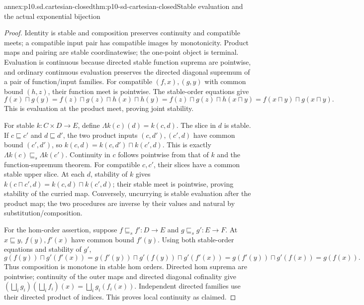 \begin{annexitem}{annex:p10.sd.cartesian-closed}{thm:p10-sd-cartesian-closed}{Stable evaluation and the actual exponential bijection}
\begin{proof}
Identity is stable and composition preserves continuity and compatible
meets; a compatible input pair has compatible images by monotonicity.
Product maps and pairing are stable coordinatewise; the one-point object
is terminal. Evaluation is continuous because directed stable function
suprema are pointwise, and ordinary continuous evaluation preserves the
directed diagonal supremum of a pair of function/input families.
For compatible \((f,x),(g,y)\) with common bound \((h,z)\), their
function meet is pointwise. The stable-order equations give
\[
 f(x)\sqcap g(y)=f(z)\sqcap g(z)\sqcap h(x)\sqcap h(y)
 =f(z)\sqcap g(z)\sqcap h(x\sqcap y)
 =f(x\sqcap y)\sqcap g(x\sqcap y).
\]
This is evaluation at the product meet, proving joint stability.

For stable \(k:C\times D\to E\), define \(\Lambda k(c)(d)=k(c,d)\).
The slice in \(d\) is stable. If \(c\sqsubseteq c'\) and
\(d\sqsubseteq d'\), the two product inputs \((c,d'),(c',d)\)
have common bound \((c',d')\), so
\(k(c,d)=k(c,d')\sqcap k(c',d)\).
This is exactly \(\Lambda k(c)\sqsubseteq_s\Lambda k(c')\).
Continuity in \(c\) follows pointwise from that of \(k\) and the
function-supremum theorem. For compatible \(c,c'\), their slices
have a common stable upper slice. At each \(d\), stability of \(k\)
gives \(k(c\sqcap c',d)=k(c,d)\sqcap k(c',d)\); their stable
meet is pointwise, proving stability of the curried map. Conversely,
uncurrying is stable evaluation after the product map; the two procedures
are inverse by their values and natural by substitution/composition.

For the hom-order assertion, suppose \(f\sqsubseteq_s f':D\to E\)
and \(g\sqsubseteq_s g':E\to F\). At \(x\sqsubseteq y\),
\(f(y),f'(x)\) have common bound \(f'(y)\). Using both stable-order
equations and stability of \(g'\),
\[
 g(f(y))\sqcap g'(f'(x))
 =g(f'(y))\sqcap g'(f(y))\sqcap g'(f'(x))
 =g(f'(y))\sqcap g'(f(x))=g(f(x)).
\]
Thus composition is monotone in stable hom orders. Directed hom suprema
are pointwise; continuity of the outer maps and directed diagonal
cofinality give \((\bigsqcup_i g_i)(\bigsqcup_i f_i)(x)
=\bigsqcup_i g_i(f_i(x))\). Independent directed families use their
directed product of indices. This proves local continuity as claimed.
\end{proof}
\end{annexitem}

